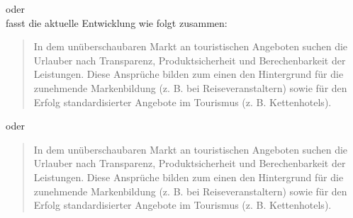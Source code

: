 oder\\
\textcite[40]{primarysource} fasst die aktuelle Entwicklung wie folgt zusammen:
\begin{quote}
In dem unüberschaubaren Markt an touristischen Angeboten suchen die Urlauber
nach Transparenz, Produktsicherheit und Berechenbarkeit der Leistungen. Diese Ansprüche bilden zum einen den Hintergrund für die zunehmende Markenbildung (z. B.
bei Reiseveranstaltern) sowie für den Erfolg standardisierter Angebote im Tourismus
(z. B. Kettenhotels).
\end{quote}
oder\\
\begin{quote}
In dem unüberschaubaren Markt an touristischen Angeboten suchen die Urlauber
nach Transparenz, Produktsicherheit und Berechenbarkeit der Leistungen. Diese Ansprüche bilden zum einen den Hintergrund für die zunehmende Markenbildung (z. B.
bei Reiseveranstaltern) sowie für den Erfolg standardisierter Angebote im Tourismus
(z. B. Kettenhotels). \textcite[40]{primarysource}
\end{quote}

